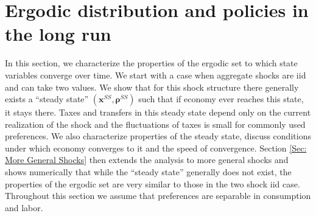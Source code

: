 \documentclass[thmsb,11pt]{article}
\begin{document}
\section{Ergodic distribution and policies in the long run } \label{sec: SteadyStates}
In this section, we characterize the properties of the ergodic set to which state variables converge over time. We start with a case when aggregate shocks are iid and can take two values. We show that for this shock structure there generally exists a ``steady state'' $\left( \bm{x}^{SS},\bm{\rho} ^{SS}\right) $  such that if economy ever reaches this state, it stays there.  Taxes and transfers in this steady state depend only on the current realization of the shock and the fluctuations of taxes is small for commonly used preferences. We also characterize properties of the steady state, discuss conditions under which economy converges to it and the speed of convergence.   Section \ref{Sec: More General Shocks}  then extends the analysis to more general shocks and shows numerically that while the ``steady state'' generally does not exist, the properties of the ergodic set are very similar to those in the two shock iid case. Throughout this section we assume that preferences are separable in consumption and 
labor.
% 
% 
\end{document}
